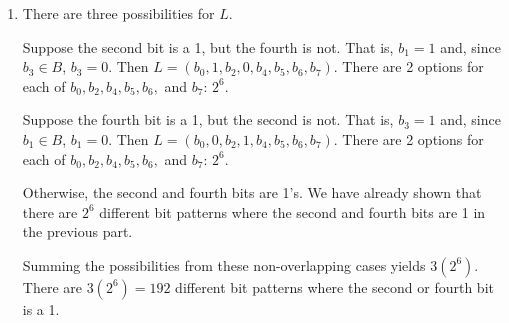 \documentclass{article}
\theoremstyle{definition}
\begin{document}
\begin{solution}
\begin{enumerate}
\item There are three possibilities for $L$.

Suppose the second bit is a 1, but the fourth is not. That is, $b_1=1$ and, since $b_3\in B$, $b_3=0$. Then $L=(b_0,1,b_2,0,b_4,b_5,b_6,b_7)$. There are 2 options for each of $b_0,b_2,b_4,b_5,b_6,$ and $b_7$: $2^6$.

Suppose the fourth bit is a 1, but the second is not. That is, $b_3=1$ and, since $b_1\in B$, $b_1=0$. Then $L=(b_0,0,b_2,1,b_4,b_5,b_6,b_7)$. There are 2 options for each of $b_0,b_2,b_4,b_5,b_6,$ and $b_7$: $2^6$.

Otherwise, the second and fourth bits are 1's. We have already shown that there are $2^6$ different bit patterns where the second and fourth bits are 1 in the previous part.

Summing the possibilities from these non-overlapping cases yields $3\left(2^6\right)$. There are $3\left(2^6\right)=192$ different bit patterns where the second or fourth bit is a 1.
\end{enumerate}\end{solution}
\end{document}
